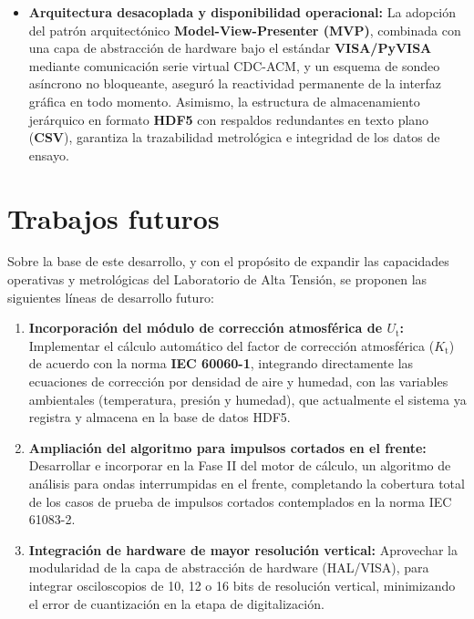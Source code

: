 \begin{itemize}
    \item \textbf{Arquitectura desacoplada y disponibilidad operacional:} La adopción del patrón arquitectónico \textbf{Model-View-Presenter (MVP)}, combinada con una capa de abstracción de hardware bajo el estándar \textbf{VISA/PyVISA} mediante comunicación serie virtual CDC-ACM, y un esquema de sondeo asíncrono no bloqueante, aseguró la reactividad permanente de la interfaz gráfica en todo momento. Asimismo, la estructura de almacenamiento jerárquico en formato \textbf{HDF5} con respaldos redundantes en texto plano (\textbf{CSV}), garantiza la trazabilidad metrológica e integridad de los datos de ensayo.
\end{itemize}

\section{Trabajos futuros}

Sobre la base de este desarrollo, y con el propósito de expandir las capacidades operativas y metrológicas del Laboratorio de Alta Tensión, se proponen las siguientes líneas de desarrollo futuro:

\begin{enumerate}
    \item \textbf{Incorporación del módulo de corrección atmosférica de $U_\text{t}$:}
    Implementar el cálculo automático del factor de corrección atmosférica ($K_\text{t}$) de acuerdo con la norma \textbf{IEC 60060-1}, integrando directamente las ecuaciones de corrección por densidad de aire y humedad, con las variables ambientales (temperatura, presión y humedad), que actualmente el sistema ya registra y almacena en la base de datos HDF5.

    \item \textbf{Ampliación del algoritmo para impulsos cortados en el frente:}
    Desarrollar e incorporar en la Fase II del motor de cálculo, un algoritmo de análisis para ondas interrumpidas en el frente, completando la cobertura total de los casos de prueba de impulsos cortados contemplados en la norma IEC 61083-2.

    \item \textbf{Integración de hardware de mayor resolución vertical:}
    Aprovechar la modularidad de la capa de abstracción de hardware (HAL/VISA), para integrar osciloscopios de 10, 12 o 16 bits de resolución vertical, minimizando el error de cuantización en la etapa de digitalización.
\end{enumerate}